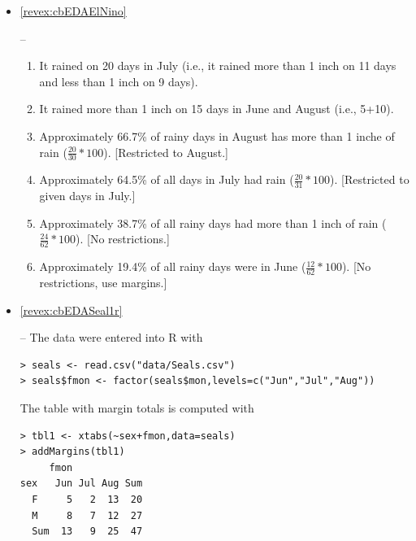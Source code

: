 \documentclass[10pt,openany]{book}\usepackage[]{graphicx}\usepackage[]{color}
\makeatletter
\newenvironment{kframe}{%
 \def\at@end@of@kframe{}%
 \ifinner\ifhmode%
  \def\at@end@of@kframe{\end{minipage}}%
  \begin{minipage}{\columnwidth}%
 \fi\fi%
 \def\FrameCommand##1{\hskip\@totalleftmargin \hskip-\fboxsep
 \colorbox{shadecolor}{##1}\hskip-\fboxsep
     \hskip-\linewidth \hskip-\@totalleftmargin \hskip\columnwidth}%
 \MakeFramed {\advance\hsize-\width
   \@totalleftmargin\z@ \linewidth\hsize
   \@setminipage}}%
 {\par\unskip\endMakeFramed%
 \at@end@of@kframe}
\newenvironment{knitrout}{}{} %
\makeatother
\begin{document}
\begin{itemize}
  \item \hypertarget{ans:cbEDAElNino}{\ref{revex:cbEDAElNino}} --
  \begin{enumerate}
    \item It rained on 20 days in July (i.e., it rained more than 1 inch on 11 days and less than 1 inch on 9 days).
    \item It rained more than 1 inch on 15 days in June and August (i.e., 5+10).
    \item Approximately 66.7\% of rainy days in August has more than 1 inche of rain ($\frac{20}{30}*100$).  [Restricted to August.]
    \item Approximately 64.5\% of all days in July had rain ($\frac{20}{31}*100$).  [Restricted to given days in July.]
    \item Approximately 38.7\% of all rainy days had more than 1 inch of rain ($\frac{24}{62}*100$).  [No restrictions.]
    \item Approximately 19.4\% of all rainy days were in June ($\frac{12}{62}*100$).  [No restrictions, use margins.]
  \end{enumerate}


  \item \hypertarget{ans:cbEDASeal1r}{\ref{revex:cbEDASeal1r}} -- The data were entered into R with
\begin{knitrout}
\color{fgcolor}\begin{kframe}
\begin{verbatim}
> seals <- read.csv("data/Seals.csv")
> seals$fmon <- factor(seals$mon,levels=c("Jun","Jul","Aug"))
\end{verbatim}
\end{kframe}
\end{knitrout}
The table with margin totals is computed with
\begin{knitrout}
\color{fgcolor}\begin{kframe}
\begin{verbatim}
> tbl1 <- xtabs(~sex+fmon,data=seals)
> addMargins(tbl1)
     fmon
sex   Jun Jul Aug Sum
  F     5   2  13  20
  M     8   7  12  27
  Sum  13   9  25  47
\end{verbatim}
\end{kframe}
\end{knitrout}


\end{itemize}
\end{document}
